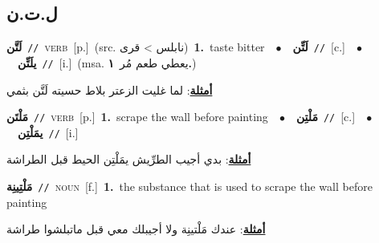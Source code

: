 \documentclass[10pt,a4paper,twoside]{article} %
\begin{document}
\begin{multicols}{2}
\vspace{-3mm}
\subsection*{\color{blue}\foreignlanguage{arabic}{ل.ت.ن}\color{blue}{}} 

{\setlength\topsep{0pt}\textbf{\foreignlanguage{arabic}{لَتَّن}}\ {\color{gray}\texttt{//}\color{black}}\ \textsc{verb}\ [p.]\ (src. \color{gray}\foreignlanguage{arabic}{نابلس > قرى}\color{black})\ \textbf{1.}~taste bitter\ \ $\bullet$\ \ \setlength\topsep{0pt}\textbf{\foreignlanguage{arabic}{لَتِّن}}\ {\color{gray}\texttt{//}\color{black}}\ [c.]\ \ $\bullet$\ \ \setlength\topsep{0pt}\textbf{\foreignlanguage{arabic}{يلَتِّن}}\ {\color{gray}\texttt{//}\color{black}}\ [i.]\ \color{gray}(msa. \foreignlanguage{arabic}{يعطي طعم مُر}~\foreignlanguage{arabic}{\textbf{١.}})\color{black}\  \begin{flushright}\color{gray}\foreignlanguage{arabic}{\textbf{\underline{\foreignlanguage{arabic}{أمثلة}}}: لما غليت الزعتر بلاط حسيته لَتَّن بثمي}\end{flushright}\color{black}} \vspace{2mm}

{\setlength\topsep{0pt}\textbf{\foreignlanguage{arabic}{مَلْتَن}}\ {\color{gray}\texttt{//}\color{black}}\ \textsc{verb}\ [p.]\ \textbf{1.}~scrape the wall before painting\ \ $\bullet$\ \ \setlength\topsep{0pt}\textbf{\foreignlanguage{arabic}{مَلْتِن}}\ {\color{gray}\texttt{//}\color{black}}\ [c.]\ \ $\bullet$\ \ \setlength\topsep{0pt}\textbf{\foreignlanguage{arabic}{يمَلْتِن}}\ {\color{gray}\texttt{//}\color{black}}\ [i.]\  \begin{flushright}\color{gray}\foreignlanguage{arabic}{\textbf{\underline{\foreignlanguage{arabic}{أمثلة}}}: بدي أجيب الطرِّيش يمَلْتِن الحيط قبل الطراشة}\end{flushright}\color{black}} \vspace{2mm}

{\setlength\topsep{0pt}\textbf{\foreignlanguage{arabic}{مَلْتِينِة}}\ {\color{gray}\texttt{//}\color{black}}\ \textsc{noun}\ [f.]\ \textbf{1.}~the substance that is used to scrape the wall before painting\  \begin{flushright}\color{gray}\foreignlanguage{arabic}{\textbf{\underline{\foreignlanguage{arabic}{أمثلة}}}: عندك مَلْتينِة ولا أجيبلك معي قبل ماتبلشوا طراشة}\end{flushright}\color{black}} \vspace{2mm}


\end{multicols}
\end{document}
